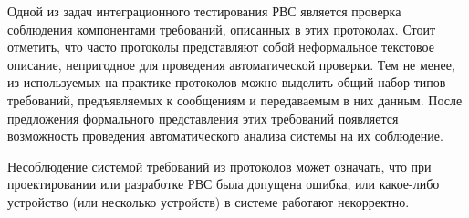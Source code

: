 Одной из задач интеграционного тестирования РВС является проверка соблюдения 
компонентами требований, описанных в этих протоколах. Стоит отметить, 
что часто протоколы представляют собой неформальное текстовое описание, 
непригодное для проведения автоматической проверки. Тем не менее, из 
используемых на практике протоколов можно выделить общий набор типов 
требований, 
предъявляемых к сообщениям и передаваемым в них данным. После предложения 
формального представления этих требований появляется возможность проведения 
автоматического анализа системы на их соблюдение.

Несоблюдение системой требований из протоколов может означать, что при 
проектировании или разработке РВС была допущена ошибка, или какое-либо 
устройство (или несколько устройств) в системе работают некорректно.
\fi